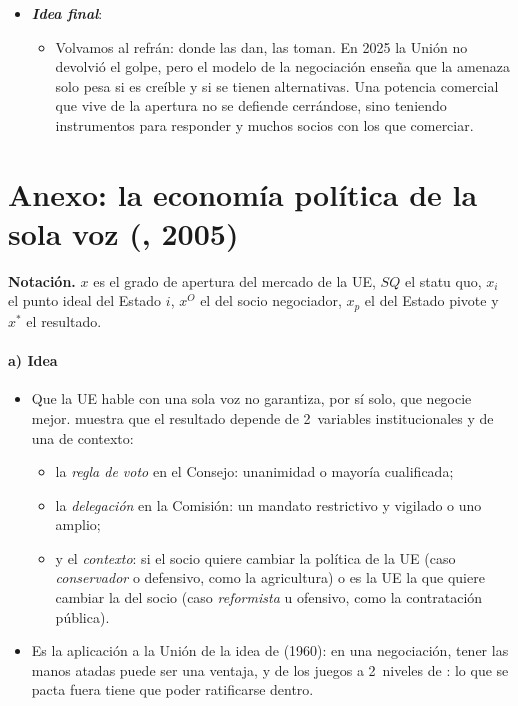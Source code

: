\documentclass[11pt]{article}
\begin{document}
\begin{itemize}
\begin{itemize}
  \item Y la red de acuerdos, la mejor defensa de la Unión, necesita que se cierren por mayoría cualificada.
  \end{itemize}
\item \textbf{\emph{Idea final}}:
  \begin{itemize}
  \item Volvamos al refrán: donde las dan, las toman. En 2025 la Unión no devolvió el golpe, pero el modelo de la negociación enseña que la amenaza solo pesa si es creíble y si se tienen alternativas. Una potencia comercial que vive de la apertura no se defiende cerrándose, sino teniendo instrumentos para responder y muchos socios con los que comerciar.
  \end{itemize}
\end{itemize}

\clearpage
\appendix

\section{Anexo: la economía política\cortetitulo{} de la sola voz (, 2005)}\label{anexo:meunier}

\begin{anotaciones}
\textbf{Notación.} $x$ es el grado de apertura del mercado de la UE, $\mathit{SQ}$ el statu quo, $x_i$ el punto ideal del Estado $i$, $x^{O}$ el del socio negociador, $x_p$ el del Estado pivote y $x^*$ el resultado.
\end{anotaciones}

\paragraph{a) Idea}

\begin{itemize}
\item Que la UE hable con una sola voz no garantiza, por sí solo, que negocie mejor. \textcite{Meunier2005Trading} muestra que el resultado depende de 2~variables institucionales y de una de contexto:
  \begin{itemize}
  \item la \emph{regla de voto} en el Consejo: unanimidad o mayoría cualificada;
  \item la \emph{delegación} en la Comisión: un mandato restrictivo y vigilado o uno amplio;
  \item y el \emph{contexto}: si el socio quiere cambiar la política de la UE (caso \emph{conservador} o defensivo, como la agricultura) o es la UE la que quiere cambiar la del socio (caso \emph{reformista} u ofensivo, como la contratación pública).
  \end{itemize}
\item Es la aplicación a la Unión de la idea de  (1960): en una negociación, tener las manos atadas puede ser una ventaja\nocite{Schelling1960Strategy}, y de los juegos a 2~niveles de \textcite{Putnam1988Diplomacy}: lo que se pacta fuera tiene que poder ratificarse dentro.
\end{itemize}
\end{document}
